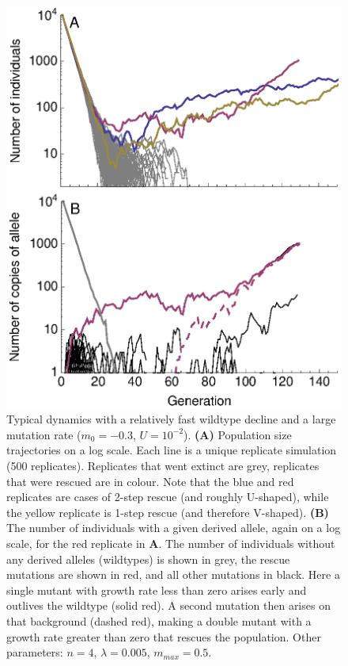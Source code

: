 \documentclass[9pt,twocolumn,twoside,lineno]{gsajnl}
\begin{document}
\begin{figure}[!h]
\centering
\includegraphics[width=\linewidth]{Figure2.eps}
\caption{
Typical dynamics with a relatively fast wildtype decline and a large mutation rate ($m_0 = -0.3$, $U=10^{-2}$).
\textbf{(A)} Population size trajectories on a log scale.
Each line is a unique replicate simulation (500 replicates).
Replicates that went extinct are grey, replicates that were rescued are in colour.
Note that the blue and red replicates are cases of 2-step rescue (and roughly U-shaped), while the yellow replicate is 1-step rescue (and therefore V-shaped).
\textbf{(B)} The number of individuals with a given derived allele, again on a log scale, for the red replicate in \textbf{A}.
The number of individuals without any derived alleles (wildtypes) is shown in grey, the rescue mutations are shown in red, and all other mutations in black.
Here a single mutant with growth rate less than zero arises early and outlives the wildtype (solid red).
A second mutation then arises on that background (dashed red), making a double mutant with a growth rate greater than zero that rescues the population. 
Other parameters: $n=4$, $\lambda=0.005$, $m_{max}=0.5$.
}%
\label{fig:Ushape}
\end{figure}
\end{document}

